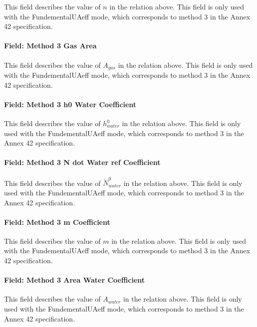 This field describes the value of \(n\) in the relation above. This field is only used with the FundementalUAeff mode, which corresponds to method 3 in the Annex 42 specification.

\paragraph{Field: Method 3 Gas Area}\label{field-method-3-gas-area}

This field describes the value of \({A_{gas}}\) in the relation above. This field is only used with the FundementalUAeff mode, which corresponds to method 3 in the Annex 42 specification.

\paragraph{Field: Method 3 h0 Water Coefficient}\label{field-method-3-h0-water-coefficient}

This field describes the value of \(h_{water}^0\) in the relation above. This field is only used with the FundementalUAeff mode, which corresponds to method 3 in the Annex 42 specification.

\paragraph{Field: Method 3 N dot Water ref Coefficient}\label{field-method-3-n-dot-water-ref-coefficient}

This field describes the value of \(\dot N_{water}^0\) in the relation above. This field is only used with the FundementalUAeff mode, which corresponds to method 3 in the Annex 42 specification.

\paragraph{Field: Method 3 m Coefficient}\label{field-method-3-m-coefficient}

This field describes the value of \(m\) in the relation above. This field is only used with the FundementalUAeff mode, which corresponds to method 3 in the Annex 42 specification.

\paragraph{Field: Method 3 Area Water Coefficient}\label{field-method-3-area-water-coefficient}

This field describes the value of \({A_{water}}\) in the relation above. This field is only used with the FundementalUAeff mode, which corresponds to method 3 in the Annex 42 specification.

